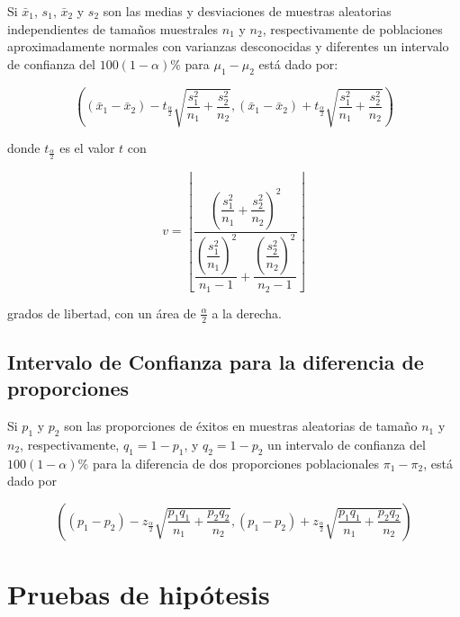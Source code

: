 \documentclass[]{book}
\begin{document}
Si \(\bar{x}_1\), \(s_1\), \(\bar{x}_2\) y \(s_2\) son las medias y desviaciones de muestras aleatorias independientes de tamaños muestrales \(n_1\) y \(n_2\), respectivamente de poblaciones aproximadamente normales con varianzas desconocidas y diferentes un intervalo de confianza del \(100\left(1-\alpha \right)\%\) para \(\mu_1 - \mu_2\) está dado por:

\begin{equation} 
\left( \left( \bar{x}_1 - \bar{x}_2 \right) - t_{\frac{\alpha}{2}}\sqrt{\dfrac{s_1^2}{n_1} + \dfrac{s_2^2}{n_2}} , \left( \bar{x}_1 - \bar{x}_2 \right) + t_{\frac{\alpha}{2}}\sqrt{\dfrac{s_1^2}{n_1} + \dfrac{s_2^2}{n_2}} \right) 
\label{eq:ic2msdd}
\end{equation}

donde \(t_{\frac{\alpha}{2}}\) es el valor \(t\) con

\begin{equation} 
v = \left\lfloor\dfrac{\left(\dfrac{s_1^2}{n_1} + \dfrac{s_2^2}{n_2} \right)^2}{\dfrac{\left( \dfrac{s_1^2}{n_1} \right)^2}{n_1-1}+\dfrac{\left( \dfrac{s_2^2}{n_2} \right)^2}{n_2-1}}\right\rfloor
\label{eq:dfsdd}
\end{equation}

grados de libertad, con un área de \(\frac{\alpha}{2}\) a la derecha.

\hypertarget{intervalo-de-confianza-para-la-diferencia-de-proporciones}{%
\subsection{Intervalo de Confianza para la diferencia de proporciones}\label{intervalo-de-confianza-para-la-diferencia-de-proporciones}}

Si \(p_1\) y \(p_2\) son las proporciones de éxitos en muestras aleatorias de tamaño \(n_1\) y \(n_2\), respectivamente, \(q_1 = 1- p_1\), y \(q_2 = 1- p_2\) un intervalo de confianza del \(100\left(1- \alpha \right)\%\) para la diferencia de dos proporciones poblacionales \(\pi_1-\pi_2\), está dado por

\begin{equation} 
\left( \left( p_1 - p_2 \right) - z_{\frac{\alpha}{2}}\sqrt{\dfrac{p_1q_1}{n_1} + \dfrac{p_2q_2}{n_2}} , \left( p_1 - p_2 \right) + z_{\frac{\alpha}{2}}\sqrt{\dfrac{p_1q_1}{n_1} + \dfrac{p_2q_2}{n_2}}  \right)
\label{eq:icprop2}
\end{equation}

\hypertarget{ph}{%
\section{Pruebas de hipótesis}\label{ph}}
\end{document}
